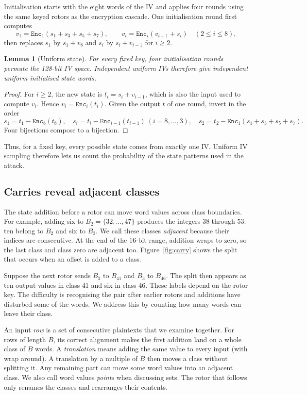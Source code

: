\documentclass[11pt]{article}
\newtheorem{lemma}[theorem]{Lemma}
\begin{document}
Initialisation starts with the eight words of the IV and applies
four rounds using the same keyed rotors as the encryption cascade.
One initialisation round first computes
\[
v_1=\mathtt{Enc}_1(s_1+s_3+s_5+s_7),\qquad
v_i=\mathtt{Enc}_i(v_{i-1}+s_i)\quad(2\le i\le8),
\]
then replaces \(s_1\) by \(s_1+v_8\) and \(s_i\) by
\(s_i+v_{i-1}\) for \(i\ge2\).

\begin{lemma}[Uniform state]\label{lem:uniform}
For every fixed key, four initialisation rounds permute the
128-bit IV space. Independent uniform IVs therefore give
independent uniform initialised state words.
\end{lemma}
\begin{proof}
For \(i\ge2\), the new state is \(t_i=s_i+v_{i-1}\), which is
also the input used to compute \(v_i\). Hence \(v_i=\mathtt{Enc}_i(t_i)\).
Given the output \(t\) of one round, invert in the order
\[
 s_1=t_1-\mathtt{Enc}_8(t_8),\quad
 s_i=t_i-\mathtt{Enc}_{i-1}(t_{i-1})\ (i=8,\ldots,3),\quad
 s_2=t_2-\mathtt{Enc}_1(s_1+s_3+s_5+s_7).
\]
Four bijections compose to a bijection.
\end{proof}

Thus, for a fixed key, every possible state comes from exactly one IV.
Uniform IV sampling therefore lets us count the probability of the
state patterns used in the attack.

\subsection{Carries reveal adjacent classes}
The state addition before a rotor can move word values across class
boundaries. For example, adding six to \(B_2=\{32,\ldots,47\}\)
produces the integers 38 through 53: ten belong to \(B_2\) and six
to \(B_3\). We call these classes \emph{adjacent} because their
indices are consecutive. At the end of the 16-bit range,
addition wraps to zero, so the last class and class zero are adjacent
too. Figure~\ref{fig:carry} shows the split that occurs when an offset is added to a class.

Suppose the next rotor sends \(B_2\) to \(B_{41}\) and \(B_3\)
to \(B_{46}\). The split then appears as ten output values in
class 41 and six in class 46. These labels depend on the rotor key.
The difficulty is recognising the pair after earlier rotors and additions
have disturbed some of the words. We address this by counting how many
words can leave their class.

An input \emph{row} is a set of consecutive plaintexts that we examine
together. For rows of length \(B\), its correct alignment makes the
first addition land on a whole class of \(B\) words. A
\emph{translation} means adding the same value to every input (with wrap around). A translation by
a multiple of \(B\) then moves a class without splitting it. Any
remaining part can move some word values into an adjacent class.
We also call word values \emph{points} when discussing sets.
The rotor that follows only renames the classes and rearranges their
contents.
\end{document}
